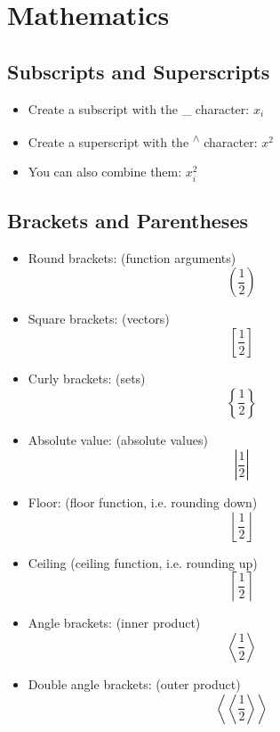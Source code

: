 \documentclass{article}
\begin{document}
\section{Mathematics}

\subsection{Subscripts and Superscripts}
\begin{itemize}
    \item Create a subscript with the \_ character: \(x_{i}\)
    \item Create a superscript with the \textsuperscript{$\wedge$} character: \(x^{2}\)
    \item You can also combine them: \(x_{i}^{2}\)
\end{itemize}

\subsection{Brackets and Parentheses}
\begin{itemize}
    \item Round brackets: (function arguments) \[\left( \frac{1}{2} \right)\]
    \item Square brackets: (vectors) \[\left[ \frac{1}{2} \right]\]
    \item Curly brackets: (sets) \[\left\{ \frac{1}{2} \right\}\]
    \item Absolute value: (absolute values) \[\left| \frac{1}{2} \right|\]
    \item Floor: (floor function, i.e. rounding down) \[\left\lfloor \frac{1}{2} \right\rfloor\]
    \item Ceiling (ceiling function, i.e. rounding up) \[\left\lceil \frac{1}{2} \right\rceil\]
    \item Angle brackets: (inner product) \[\left\langle \frac{1}{2} \right\rangle\]
    \item Double angle brackets: (outer product) \[\left\langle \left\langle \frac{1}{2} \right\rangle \right\rangle\]
\end{itemize}
\end{document}
